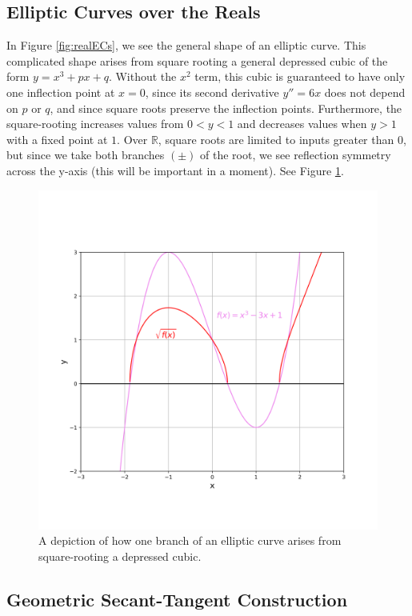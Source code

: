 \documentclass[11pt, a4paper]{report}
\newcommand{\reals}{\mathbb{R}}
\begin{document}
\subsection{Elliptic Curves over the Reals}

In Figure \ref{fig:realECs}, we see the general shape of an elliptic curve. This complicated shape arises from square rooting a general depressed cubic of the form $y=x^3+px+q$. Without the $x^2$ term, this cubic is guaranteed to have only one inflection point at $x=0$, since its second derivative $y'' = 6x$ does not depend on $p$ or $q$, and since square roots preserve the inflection points.
Furthermore, the square-rooting increases values from $0<y<1$ and decreases values when $y>1$ with a fixed point at $1$. Over $\reals$, square roots are limited to inputs greater than $0$, but since we take both branches $(\pm)$ of the root, we see reflection symmetry across the y-axis (this will be important in a moment).\autocite{haese} See Figure \ref{fig:cubicsqrt}.
\begin{figure}[ht]
\begin{center}
\includegraphics[width=.8\linewidth]{cubic_function.png} 
\caption{A depiction of how one branch of an elliptic curve arises from square-rooting a depressed cubic.}
\label{fig:cubicsqrt}
\end{center}
\end{figure}

\subsection{Geometric Secant-Tangent Construction}
\end{document}
